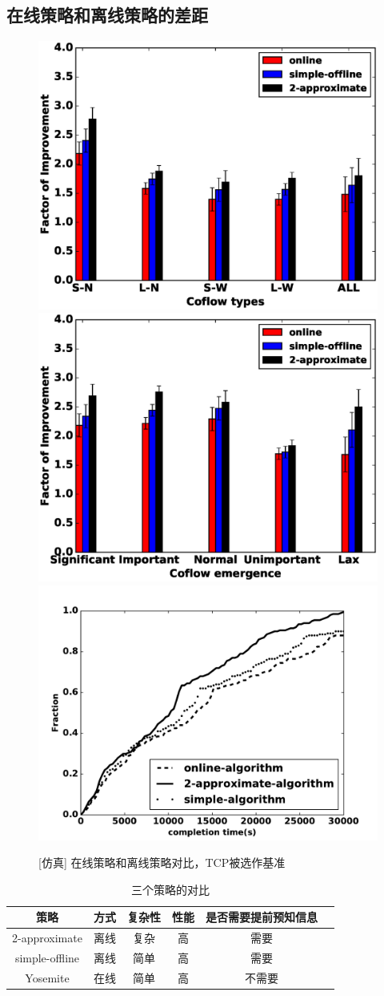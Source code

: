 \subsection{在线策略和离线策略的差距}

\begin{figure}[h]
\centering 
{}
 {\includegraphics[width=0.32\columnwidth]{figures/Yosemite/figs/performance/nfake5.eps}}
{\includegraphics[width=0.32\columnwidth]{figures/Yosemite/figs/performance/nfake4.eps}}
{\includegraphics[width=0.32\columnwidth]{figures/Yosemite/figs/performance/online_offline.pdf}}
\caption{[仿真] 在线策略和离线策略对比，TCP被选作基准}
\label{Yosemite-evaluation_diff_fig}
\end{figure}

\begin{table}[h]
\centering
\footnotesize
          \caption{三个策略的对比} \label{tab-Yosemite-comparison}
          \begin{tabular}{|c|c|c|c|c|c|} \hline
              \toprule
              策略  &方式 & 复杂性 & 性能 &是否需要提前预知信息\\
              \midrule
              2-approximate & 离线    & 复杂     & 高 &需要\\
              \toprule
             simple-offline & 离线     & 简单     & 高& 需要 \\
             \toprule
            Yosemite & 在线    & 简单     & 高 & 不需要\\
              \bottomrule
          \end{tabular}
      \end{table}
      
